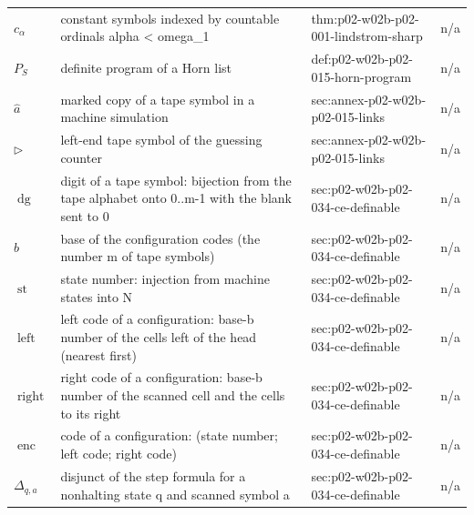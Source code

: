 \begin{longtable}{@{}p{}p{}p{}p{}@{}}
\(c_\alpha\) & constant symbols indexed by countable ordinals alpha < omega\_1 & thm:\allowbreak{}p02-\allowbreak{}w02b-\allowbreak{}p02-\allowbreak{}001-\allowbreak{}lindstrom-\allowbreak{}sharp & n/a \\
\(P_S\) & definite program of a Horn list & def:\allowbreak{}p02-\allowbreak{}w02b-\allowbreak{}p02-\allowbreak{}015-\allowbreak{}horn-\allowbreak{}program & n/a \\
\(\hat a\) & marked copy of a tape symbol in a machine simulation & sec:\allowbreak{}annex-\allowbreak{}p02-\allowbreak{}w02b-\allowbreak{}p02-\allowbreak{}015-\allowbreak{}links & n/a \\
\(\triangleright\) & left-end tape symbol of the guessing counter & sec:\allowbreak{}annex-\allowbreak{}p02-\allowbreak{}w02b-\allowbreak{}p02-\allowbreak{}015-\allowbreak{}links & n/a \\
\(\operatorname{dg}\) & digit of a tape symbol: bijection from the tape alphabet onto {0..m-1} with the blank sent to 0 & sec:\allowbreak{}p02-\allowbreak{}w02b-\allowbreak{}p02-\allowbreak{}034-\allowbreak{}ce-\allowbreak{}definable & n/a \\
\(b\) & base of the configuration codes (the number m of tape symbols) & sec:\allowbreak{}p02-\allowbreak{}w02b-\allowbreak{}p02-\allowbreak{}034-\allowbreak{}ce-\allowbreak{}definable & n/a \\
\(\operatorname{st}\) & state number: injection from machine states into N & sec:\allowbreak{}p02-\allowbreak{}w02b-\allowbreak{}p02-\allowbreak{}034-\allowbreak{}ce-\allowbreak{}definable & n/a \\
\(\operatorname{left}\) & left code of a configuration: base-b number of the cells left of the head (nearest first) & sec:\allowbreak{}p02-\allowbreak{}w02b-\allowbreak{}p02-\allowbreak{}034-\allowbreak{}ce-\allowbreak{}definable & n/a \\
\(\operatorname{right}\) & right code of a configuration: base-b number of the scanned cell and the cells to its right & sec:\allowbreak{}p02-\allowbreak{}w02b-\allowbreak{}p02-\allowbreak{}034-\allowbreak{}ce-\allowbreak{}definable & n/a \\
\(\operatorname{enc}\) & code of a configuration: (state number; left code; right code) & sec:\allowbreak{}p02-\allowbreak{}w02b-\allowbreak{}p02-\allowbreak{}034-\allowbreak{}ce-\allowbreak{}definable & n/a \\
\(\Delta_{q,a}\) & disjunct of the step formula for a nonhalting state q and scanned symbol a & sec:\allowbreak{}p02-\allowbreak{}w02b-\allowbreak{}p02-\allowbreak{}034-\allowbreak{}ce-\allowbreak{}definable & n/a \\

\end{longtable}
